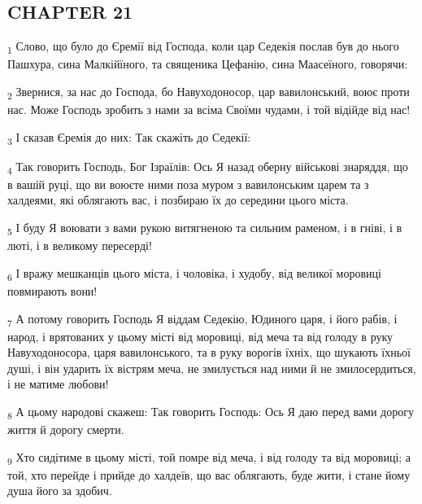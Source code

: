 \subsection{CHAPTER 21}
\begin{tcolorbox}
\textsubscript{1} Слово, що було до Єремії від Господа, коли цар Седекія послав був до нього Пашхура, сина Малкійїного, та священика Цефанію, сина Маасеїного, говорячи:
\end{tcolorbox}
\begin{tcolorbox}
\textsubscript{2} Звернися, за нас до Господа, бо Навуходоносор, цар вавилонський, воює проти нас. Може Господь зробить з нами за всіма Своїми чудами, і той відійде від нас!
\end{tcolorbox}
\begin{tcolorbox}
\textsubscript{3} І сказав Єремія до них: Так скажіть до Седекії:
\end{tcolorbox}
\begin{tcolorbox}
\textsubscript{4} Так говорить Господь, Бог Ізраїлів: Ось Я назад оберну військові знаряддя, що в вашій руці, що ви воюєте ними поза муром з вавилонським царем та з халдеями, які облягають вас, і позбираю їх до середини цього міста.
\end{tcolorbox}
\begin{tcolorbox}
\textsubscript{5} І буду Я воювати з вами рукою витягненою та сильним раменом, і в гніві, і в люті, і в великому пересерді!
\end{tcolorbox}
\begin{tcolorbox}
\textsubscript{6} І вражу мешканців цього міста, і чоловіка, і худобу, від великої моровиці повмирають вони!
\end{tcolorbox}
\begin{tcolorbox}
\textsubscript{7} А потому говорить Господь Я віддам Седекію, Юдиного царя, і його рабів, і народ, і врятованих у цьому місті від моровиці, від меча та від голоду в руку Навуходоносора, царя вавилонського, та в руку ворогів їхніх, що шукають їхньої душі, і він ударить їх вістрям меча, не змилується над ними й не змилосердиться, і не матиме любови!
\end{tcolorbox}
\begin{tcolorbox}
\textsubscript{8} А цьому народові скажеш: Так говорить Господь: Ось Я даю перед вами дорогу життя й дорогу смерти.
\end{tcolorbox}
\begin{tcolorbox}
\textsubscript{9} Хто сидітиме в цьому місті, той помре від меча, і від голоду та від моровиці; а той, хто перейде і прийде до халдеїв, що вас облягають, буде жити, і стане йому душа його за здобич.
\end{tcolorbox}
